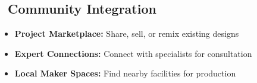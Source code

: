 \subsection*{\faUsers\ Community Integration}
\begin{itemize}[leftmargin=*]
    \item \textbf{\textcolor{fabRed}{Project Marketplace:}} Share, sell, or remix existing designs
    \item \textbf{\textcolor{fabRed}{Expert Connections:}} Connect with specialists for consultation
    \item \textbf{\textcolor{fabRed}{Local Maker Spaces:}} Find nearby facilities for production
\end{itemize} 